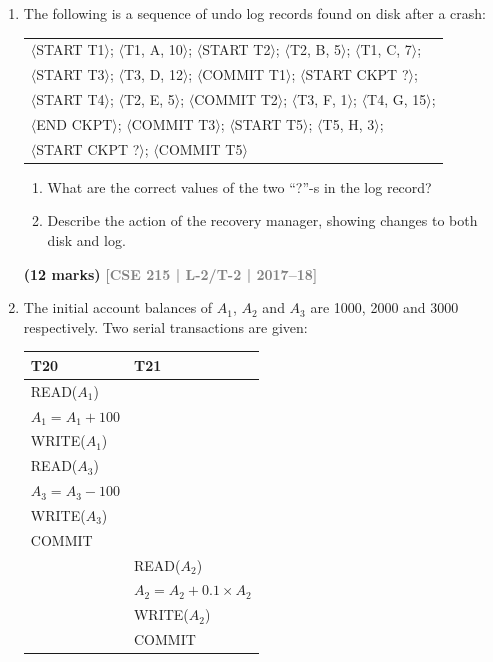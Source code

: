 \documentclass[12pt]{article}
\newcommand{\yr}[1]{\hfill\textcolor{gray}{\small\textbf{[#1]}}}
\newcommand{\mk}[1]{\textcolor{orange!70!black}{\small\textbf{(#1 marks)}}}
\begin{document}
\begin{enumerate}
\item The following is a sequence of undo log records found on disk after a crash:
\begin{center}
\small\ttfamily
\begin{tabular}{l}
$\langle$START T1$\rangle$; $\langle$T1, A, 10$\rangle$; $\langle$START T2$\rangle$; $\langle$T2, B, 5$\rangle$; $\langle$T1, C, 7$\rangle$;\\
$\langle$START T3$\rangle$; $\langle$T3, D, 12$\rangle$; $\langle$COMMIT T1$\rangle$; $\langle$START CKPT ?\thinspace$\rangle$;\\
$\langle$START T4$\rangle$; $\langle$T2, E, 5$\rangle$; $\langle$COMMIT T2$\rangle$; $\langle$T3, F, 1$\rangle$; $\langle$T4, G, 15$\rangle$;\\
$\langle$END CKPT$\rangle$; $\langle$COMMIT T3$\rangle$; $\langle$START T5$\rangle$; $\langle$T5, H, 3$\rangle$;\\
$\langle$START CKPT ?\thinspace$\rangle$; $\langle$COMMIT T5$\rangle$
\end{tabular}
\end{center}
\begin{enumerate}
  \item What are the correct values of the two ``?''-s in the log record?
  \item Describe the action of the recovery manager, showing changes to both disk and log.
\end{enumerate}
\mk{12} \yr{CSE 215 | L-2/T-2 | 2017--18}


\item The initial account balances of $A_1$, $A_2$ and $A_3$ are 1000, 2000 and 3000 respectively. Two serial transactions are given:

\medskip
\begin{center}
\begin{tabular}{ll}
\toprule
\textbf{T20} & \textbf{T21}\\
\midrule
READ($A_1$) &\\
$A_1 = A_1 + 100$ &\\
WRITE($A_1$) &\\
READ($A_3$) &\\
$A_3 = A_3 - 100$ &\\
WRITE($A_3$) &\\
COMMIT &\\
& READ($A_2$)\\
& $A_2 = A_2 + 0.1 \times A_2$\\
& WRITE($A_2$)\\
& COMMIT\\
\bottomrule
\end{tabular}
\end{center}


\end{enumerate}
\end{document}
